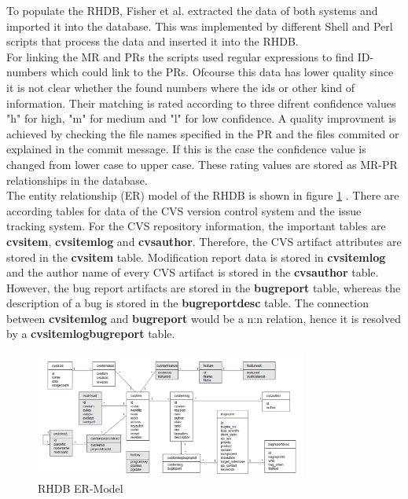 To populate the RHDB, Fisher et al. extracted the data of both systems and imported it into the database. This was implemented by different Shell and Perl scripts that process the data and inserted it into the RHDB. \\
For linking the MR and PRs the scripts used regular expressions to find ID-numbers which could link to the PRs. Ofcourse this data has lower quality since it is not clear whether the found numbers where the ids or other kind of information. Their matching is rated according to three difrent confidence values "h" for high, "m" for medium and "l" for low confidence. A quality improvment is achieved by checking the file names specified in the PR and the files commited or explained in the commit message. If this is the case the confidence value is changed from lower case to upper case. These rating values are stored as MR-PR relationships in the database.\\
The entity relationship (ER) model of the RHDB is shown in figure \ref{fig:rhdber} \cite{fischer2003populating}. There are according tables for data of the CVS version control system and the issue tracking system. For the CVS repository information, the important tables are \textbf{cvsitem}, \textbf{cvsitemlog} and \textbf{cvsauthor}. Therefore, the CVS artifact attributes are stored in the \textbf{cvsitem} table. Modification report data is stored in \textbf{cvsitemlog} and the author name of every CVS artifact is stored in the \textbf{cvsauthor} table. However, the bug report artifacts are stored in the \textbf{bugreport} table, whereas the description of a bug is stored in the \textbf{bugreportdesc} table. The connection between \textbf{cvsitemlog} and \textbf{bugreport} would be a n:n relation, hence it is resolved by a \textbf{cvsitemlogbugreport} table.

\begin{figure}[t]
	\centering
	\includegraphics[width=0.8\textwidth]{images/rhdb_er}
	\caption{RHDB ER-Model \cite{fischer2003populating}}
	\label{fig:rhdber}
\end{figure}

